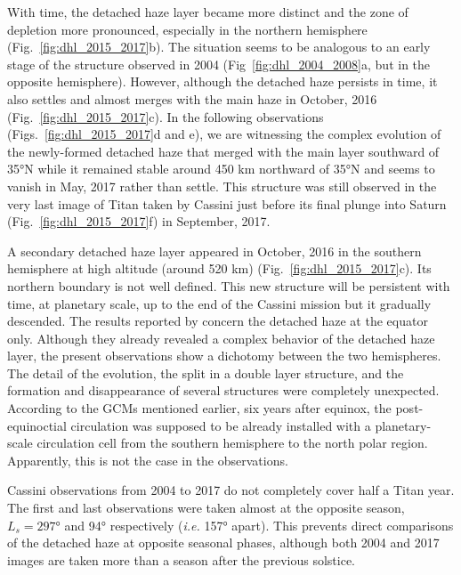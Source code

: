 With time, the detached haze layer became more distinct and the zone of depletion more pronounced, especially in the
northern hemisphere (Fig.~\ref{fig:dhl_2015_2017}b). The situation seems to be analogous to an early stage of
the structure observed in 2004 (Fig~\ref{fig:dhl_2004_2008}a, but in the opposite hemisphere).
However, although the detached haze persists in time,
it also settles and almost merges with the main haze in October, 2016 (Fig.~\ref{fig:dhl_2015_2017}c).
In the  following observations (Figs.~\ref{fig:dhl_2015_2017}d and e), we are
witnessing the complex evolution of the newly-formed detached haze that merged with the main layer southward
of \ang{35}N while it remained stable around 450 km northward of \ang{35}N and seems to vanish in May, 2017 rather than settle.
This structure was still observed in the very last image of Titan taken by Cassini just before its final plunge into Saturn
 (Fig.~\ref{fig:dhl_2015_2017}f) in September, 2017.

A secondary detached haze layer appeared in October, 2016 in the southern hemisphere at high altitude (around 520 km)
(Fig.~\ref{fig:dhl_2015_2017}c). Its northern boundary is not well defined. This new structure will be persistent with
time, at planetary scale, up to the end of the Cassini mission but it gradually descended. The results reported by \cite{West2018}
concern the detached haze at the equator only. Although they already revealed a complex behavior of the detached haze layer, the
present observations show a dichotomy between the two hemispheres. The detail of the evolution, the split in a double layer
structure, and the formation and disappearance of several structures were completely unexpected. According to the GCMs mentioned earlier, six years
after equinox, the post-equinoctial circulation was supposed to be already installed with a planetary-scale circulation cell
from the southern hemisphere to the north polar region. Apparently, this is not the case in the observations.

Cassini observations from 2004 to 2017 do not completely cover half a Titan year. The first and last observations
were taken almost at the opposite season, $L_s=\ang{297}$ and \ang{94} respectively (\emph{i.e.} \ang{157} apart).
This prevents direct comparisons of the detached haze at opposite seasonal phases,
although both 2004 and 2017 images are taken more than a season after the previous solstice.
